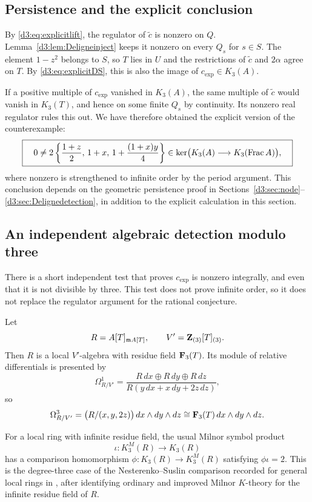 \subsection{Persistence and the explicit conclusion}
By \eqref{d3:eq:explicitlift}, the regulator of $\widetilde c$ is nonzero on $Q$. Lemma~\ref{d3:lem:Deligneinject} keeps it nonzero on every $Q_s$ for $s\in S$. The element $1-z^2$ belongs to $S$, so $T$ lies in $U$ and the restrictions of $\widetilde c$ and $2\alpha$ agree on $T$. By \eqref{d3:eq:explicitDS}, this is also the image of $c_{\mathrm{exp}}\in K_3(A)$.

If a positive multiple of $c_{\mathrm{exp}}$ vanished in $K_3(A)$, the same multiple of $\widetilde c$ would vanish in $K_3(T)$, and hence on some finite $Q_s$ by continuity. Its nonzero real regulator rules this out. We have therefore obtained the explicit version of the counterexample:
\begin{equation}\label{d3:eq:explicitconclusion}
\boxed{\quad
0\neq 2\left\{\frac{1+z}{2},\,1+x,\,
1+\frac{(1+x)y}{4}\right\}\in
\ker\bigl(K_3(A)\longrightarrow K_3(\operatorname{Frac} A)\bigr),
\quad}
\end{equation}
where nonzero is strengthened to infinite order by the period argument. This conclusion depends on the geometric persistence proof in Sections~\ref{d3:sec:node}--\ref{d3:sec:Delignedetection}, in addition to the explicit calculation in this section.

\subsection{An independent algebraic detection modulo three}\label{d3:sec:modthree}

There is a short independent test that proves $c_{\mathrm{exp}}$ is nonzero integrally, and even that it is not divisible by three. This test does not prove infinite order, so it does not replace the regulator argument for the rational conjecture.

Let
\[
R=A[T]_{\mathfrak m A[T]},\qquad V'=\mathbf Z_{(3)}[T]_{(3)}.
\]
Then $R$ is a local $V'$-algebra with residue field $\mathbf F_3(T)$. Its module of relative differentials is presented by
\[
\Omega^1_{R/V'}=
\frac{R\,dx\oplus R\,dy\oplus R\,dz}
 {R(y\,dx+x\,dy+2z\,dz)},
\]
so
\[
\Omega^3_{R/V'}=
\bigl(R/(x,y,2z)\bigr)\,dx\wedge dy\wedge dz
\cong\mathbf F_3(T)\,dx\wedge dy\wedge dz.
\]

For a local ring with infinite residue field, the usual Milnor symbol product
\[
\iota:K^M_3(R)\longrightarrow K_3(R)
\]
has a comparison homomorphism $\phi:K_3(R)\to K^M_3(R)$ satisfying $\phi\iota=2$. This is the degree-three case of the Nesterenko--Suslin comparison recorded for general local rings in \cite[Proposition~4.2.8(5),(6)]{KerzThesis}, after identifying ordinary and improved Milnor $K$-theory for the infinite residue field of $R$.

